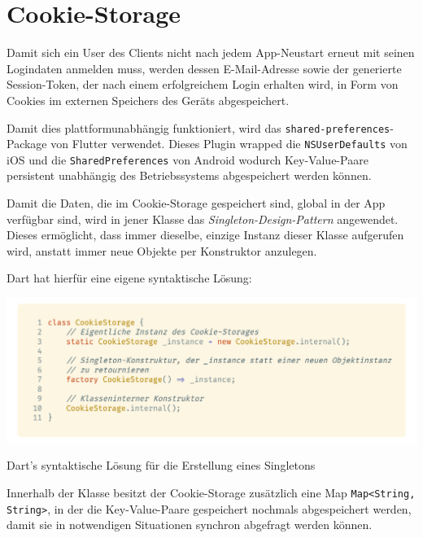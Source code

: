 \section{Cookie-Storage}
\label{clientcookie}

Damit sich ein User des Clients nicht nach jedem App-Neustart erneut mit seinen Logindaten anmelden muss,
werden dessen E-Mail-Adresse sowie der generierte Session-Token, der nach einem erfolgreichem Login erhalten wird, 
in Form von Cookies im externen Speichers des Geräts abgespeichert.


Damit dies plattformunabhängig funktioniert, wird das \lstinline{shared-preferences}-Package von Flutter
verwendet.
Dieses Plugin wrapped die \lstinline{NSUserDefaults} von iOS und die \lstinline{SharedPreferences} von Android
wodurch Key-Value-Paare persistent unabhängig des Betriebssystems abgespeichert werden können.

Damit die Daten, die im Cookie-Storage gespeichert sind, global in der App verfügbar sind, wird in jener
Klasse das \textit{Singleton-Design-Pattern} angewendet. Dieses ermöglicht, dass immer dieselbe, einzige Instanz
dieser Klasse aufgerufen wird, anstatt immer neue Objekte per Konstruktor anzulegen.

Dart hat hierfür eine eigene syntaktische Lösung:

\begin{code}[H]
    \centering
    \includegraphics[width=1\textwidth]{images/Client/util/cookie-storage/cookieStorageSingleton.png}
    \vspace{-25pt}
    \caption{Dart's syntaktische Lösung für die Erstellung eines Singletons}
\end{code}

Innerhalb der Klasse besitzt der Cookie-Storage zusätzlich eine Map \lstinline{Map<String, String>}, in der die Key-Value-Paare
gespeichert nochmals abgespeichert werden, damit sie in notwendigen Situationen synchron abgefragt werden können.


